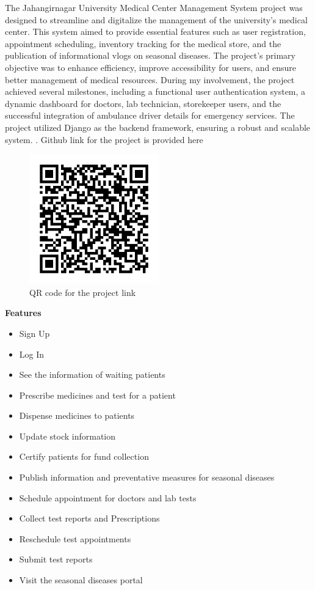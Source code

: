 \documentclass[a4paper,12pt]{article}
\begin{document}
The Jahangirnagar University Medical Center Management System project was designed to streamline and
digitalize the management of the university’s medical center. This system aimed to provide essential features
such as user registration, appointment scheduling, inventory tracking for the medical store, and the
publication of informational vlogs on seasonal diseases. The project’s primary objective was to enhance
efficiency, improve accessibility for users, and ensure better management of medical resources. 
During my involvement, the project achieved several milestones, including a functional user authentication
system, a dynamic dashboard for doctors, lab technician, storekeeper users, and the successful integration of ambulance driver details for emergency services. The project utilized Django as the backend framework, ensuring a robust and scalable system.
. Github link for the project is provided here
\begin{figure}[H]
    \centering
    \includegraphics[width=0.5\textwidth]{images/simple_prcode.png}
    \caption{QR code for the project link}
    \label{fig:qrcode}
\end{figure}
\textbf{Features}
\begin{itemize}
    \item Sign Up
    \item Log In
    \item See the information of waiting patients
    \item Prescribe medicines and test for a patient
    \item Dispense medicines to patients
    \item Update stock information
    \item Certify patients for fund collection
    \item Publish information and preventative measures for seasonal diseases
    \item Schedule appointment for doctors and lab tests
    \item Collect test reports and Prescriptions
    \item Reschedule test appointments
    \item Submit test reports
    \item Visit the seasonal diseases portal
\end{itemize}
\newpage
\end{document}
